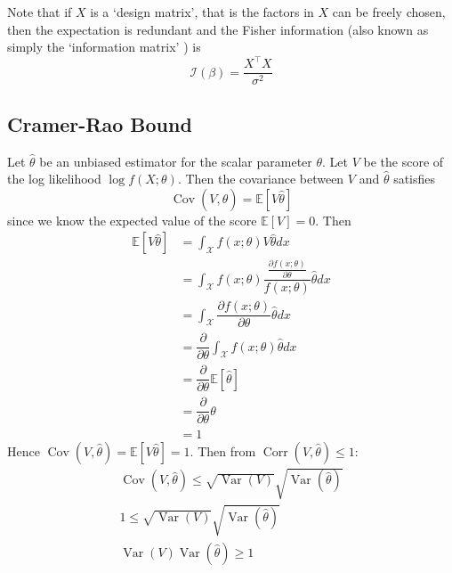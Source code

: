 \documentclass[11pt]{report} %
\begin{document}
Note that if $X$ is a `design matrix', that is the factors in $X$ can be freely chosen, then the expectation is redundant and the Fisher information (also known as simply the `information matrix' \cite{Atkinson2007}) is
\begin{equation}
\mathcal{I}\left(\beta\right) = \dfrac{X^{\top}X}{\sigma^{2}}
\end{equation}

\subsection{Cramer-Rao Bound}

Let $\hat{\theta}$ be an unbiased estimator for the scalar parameter $\theta$.  Let $V$ be the score of the log likelihood $\log f\left(X;\theta\right)$. Then the covariance between $V$ and $\hat{\theta}$ satisfies
\begin{equation}
\operatorname{Cov}\left(V, \hat{\theta}\right) = \mathbb{E}\left[V\hat{\theta}\right]
\end{equation}
since we know the expected value of the score $\mathbb{E}\left[V\right] = 0$. Then
\begin{align}
\mathbb{E}\left[V\hat{\theta}\right] &= \int_{\mathcal{X}}f\left(x;\theta\right)V\hat{\theta}dx \\
&= \int_{\mathcal{X}}f\left(x;\theta\right)\dfrac{\frac{\partial f\left(x;\theta\right)}{\partial \theta}}{f\left(x;\theta\right)}\hat{\theta}dx \\
&= \int_{\mathcal{X}}\dfrac{\partial f\left(x;\theta\right)}{\partial \theta}\hat{\theta}dx \\
&= \dfrac{\partial }{\partial \theta}\int_{\mathcal{X}}f\left(x;\theta\right)\hat{\theta}dx \\
&= \dfrac{\partial }{\partial \theta}\mathbb{E}\left[\hat{\theta}\right] \\
&= \dfrac{\partial }{\partial \theta}\theta \\
&= 1
\end{align}
Hence $\operatorname{Cov}\left(V, \hat{\theta}\right) = \mathbb{E}\left[V\hat{\theta}\right] = 1$. Then from $\operatorname{Corr}\left(V, \hat{\theta}\right) \leq 1$:
\begin{gather}
\operatorname{Cov}\left(V, \hat{\theta}\right) \leq \sqrt{\operatorname{Var}\left(V\right)}\sqrt{\operatorname{Var}\left(\hat{\theta}\right)} \\
1 \leq \sqrt{\operatorname{Var}\left(V\right)}\sqrt{\operatorname{Var}\left(\hat{\theta}\right)} \\
\operatorname{Var}\left(V\right)\operatorname{Var}\left(\hat{\theta}\right) \geq 1
\end{gather}
\end{document}
